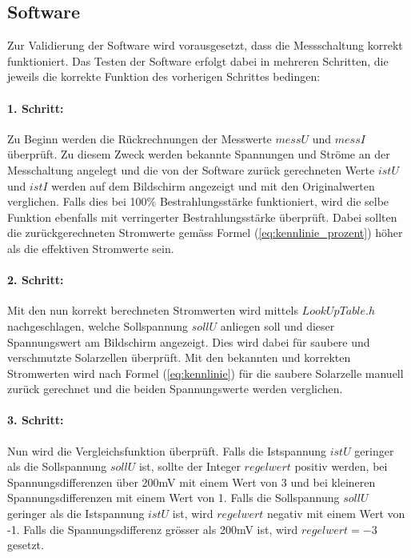 \subsection{Software}
Zur Validierung der Software wird vorausgesetzt, dass die Messschaltung korrekt funktioniert. Das Testen der Software erfolgt dabei in mehreren Schritten, die jeweils die korrekte Funktion des vorherigen Schrittes bedingen:

\paragraph{1. Schritt:}
Zu Beginn werden die Rückrechnungen der Messwerte $messU$ und $messI$ überprüft. Zu diesem Zweck werden bekannte Spannungen und Ströme an der Messchaltung angelegt und die von der Software zurück gerechneten Werte $istU$ und $istI$ werden auf dem Bildschirm angezeigt und mit den Originalwerten verglichen. Falls dies bei 100\% Bestrahlungsstärke funktioniert, wird die selbe Funktion ebenfalls mit verringerter Bestrahlungsstärke überprüft. Dabei sollten die zurückgerechneten Stromwerte gemäss Formel (\ref{eq:kennlinie_prozent}) höher als die effektiven Stromwerte sein.

\paragraph{2. Schritt:}
Mit den nun korrekt berechneten Stromwerten wird mittels $LookUpTable.h$ nachgeschlagen, welche Sollspannung $sollU$ anliegen soll und dieser Spannungswert am Bildschirm angezeigt. Dies wird dabei für saubere und verschmutzte Solarzellen überprüft. Mit den bekannten und korrekten Stromwerten wird nach Formel (\ref{eq:kennlinie}) für die saubere Solarzelle manuell zurück gerechnet und die beiden Spannungswerte werden verglichen.

\paragraph{3. Schritt:}
Nun wird die Vergleichsfunktion überprüft. Falls die Istspannung $istU$ geringer als die Sollspannung $sollU$ ist, sollte der Integer $regelwert$ positiv werden, bei Spannungsdifferenzen über 200mV mit einem Wert von 3 und bei kleineren Spannungsdifferenzen mit einem Wert von 1. Falls die Sollspannung $sollU$ geringer als die Istspannung $istU$ ist, wird $regelwert$ negativ mit einem Wert von -1. Falls die Spannungsdifferenz grösser als 200mV ist, wird $regelwert=-3$ gesetzt.
